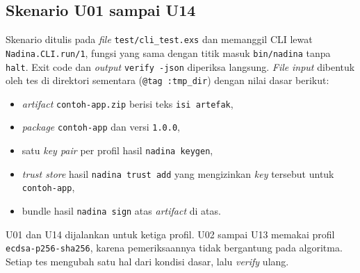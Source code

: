 \subsection{Skenario U01 sampai U14}

Skenario ditulis pada \textit{file} \texttt{test/cli\_test.exs} dan memanggil CLI lewat
\texttt{Nadina.CLI.run/1}, fungsi yang sama dengan titik masuk \texttt{bin/nadina} tanpa
\texttt{halt}. Exit code dan \textit{output} \texttt{verify -json} diperiksa langsung. \textit{File}
\textit{input} dibentuk oleh tes di direktori sementara (\texttt{@tag :tmp\_dir}) dengan nilai
dasar berikut:

\begin{itemize}
  \item \textit{artifact} \texttt{contoh-app.zip} berisi teks \texttt{isi artefak},
  \item \textit{package} \texttt{contoh-app} dan versi \texttt{1.0.0},
  \item satu \textit{key pair} per profil hasil \texttt{nadina keygen},
  \item \textit{trust store} hasil \texttt{nadina trust add} yang mengizinkan \textit{key}
    tersebut untuk \texttt{contoh-app},
  \item bundle hasil \texttt{nadina sign} atas \textit{artifact} di atas.
\end{itemize}

U01 dan U14 dijalankan untuk ketiga profil. U02 sampai U13 memakai profil
\texttt{ecdsa-p256-sha256}, karena pemeriksaannya tidak bergantung pada algoritma.
Setiap tes mengubah satu hal dari kondisi dasar, lalu \textit{verify} ulang.


